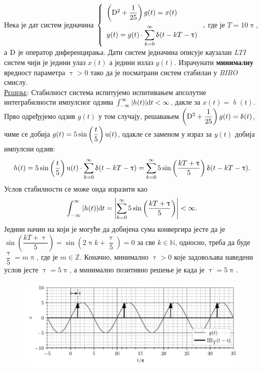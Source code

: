 \PID 
Нека је  
дат систем једначина
$
\displaystyle
\left\lbrace
\begin{array}{l}
\left({\rm D}^2 + \dfrac{1}{25} \right) g(t) = x(t) 
\\[4mm] \displaystyle
y(t) = g(t) \cdot \sum_{k=0}^{\infty} \updelta(t - kT - \uptau)
\end{array} 
\right.,$
где је $T = 10\uppi$, а ${\rm D}$ је оператор 
диференцирања. Дати систем једначина описује
каузалан \textit{LTI} систем чији је једини улаз 
$x(t)$ а једини излаз $y(t)$.
Израчунати \textbf{минималну} вредност параметра $\uptau > 0$ тако да је посматрани систем
стабилан у \textit{BIBO} смислу.
\\[2mm]

\textsc{\underline{Решење}}: Стабилност система испитујемо испитивањем апсолутне интеграбилности импулсног одзива
$\int_{-\infty}^{\infty} |h(t)| {\rm d} t < \infty$, дакле за $x(t) = \updelta(t)$. Прво одређујемо одзив $g(t)$ у том случају,
решавањем $\left({\rm D}^2 + \dfrac{1}{25} \right) g(t) = \updelta(t)$, чиме се добија 
$g(t) =  5 \sin\left(\dfrac{t}{5}\right) {\rm u}(t)$, одакле се заменом у израз за $y(t)$ добија импулсни одзив: 
\begin{equation}
    h(t) = 5 \sin\left(\dfrac{t}{5}\right) \uu(t) \cdot \sum_{k=0}^{\infty} \updelta(t - kT - \uptau) 
         = \sum_{k=0}^{\infty}  5 \sin\left(\dfrac{kT + \uptau}{5}\right) \updelta(t - kT - \uptau). \label{eq:\ID.h}
\end{equation}
Услов стабилности се може онда изразити као
\begin{equation}
    \int_{-\infty}^{\infty} |h(t)| {\rm d} t = \left| \sum_{k=0}^{\infty}  5 \sin\left(\dfrac{kT + \uptau}{5}\right)\right| < \infty.  
\end{equation}
Једини начин на који је могуће да добијена сума конвергира јесте да је
$\sin\left(\dfrac{kT + \uptau}{5}\right) =  \sin\left(2\uppi k + \dfrac{\uptau}{5}\right) = 0$ за све $k \in \mathbb{N}$,
односно, треба да буде $\dfrac{\uptau}{5} = m\uppi$, где је $m \in \mathbb{Z}$. Коначно, минимално $\uptau>0$ које задовољава наведени
услов јесте $\uptau = 5\uppi$, а минимално позитивно решење је када је $\uptau = 5\uppi$.

\begin{figure}[!b]
    \centering
    \includegraphics{fig/delta_odabiranje_sin_edit.pdf }
    \caption{}
    \label{fig:\ID.ideja}
\end{figure}

